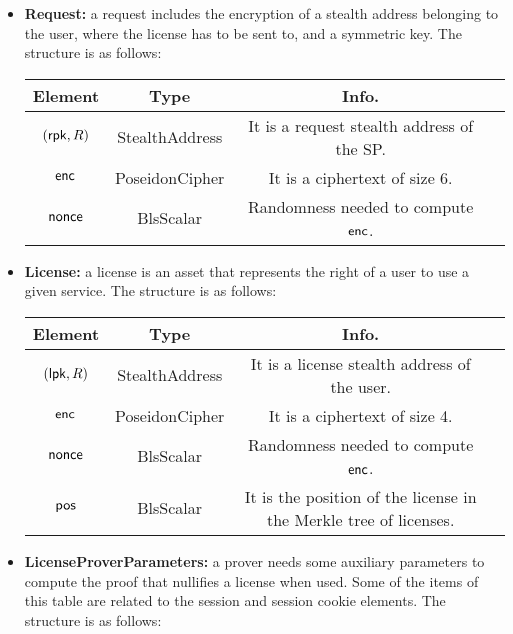 \begin{itemize}
    \item \textbf{Request:} a request includes the encryption of a stealth address belonging to the user, where the license has to be sent to, and a symmetric key. The structure is as follows:

    \begin{center}
        \begin{tabular}{ |c|c|c|c| } 
        \hline
        \textbf{Element} & \textbf{Type} & \textbf{Info.} \\
        \hline
        $(\mathsf{rpk}, R)$ & StealthAddress & It is a request stealth address of the SP. \\
        $\mathsf{enc}$ & PoseidonCipher & It is a ciphertext of size 6. \\
        $\mathsf{nonce}$ & BlsScalar & Randomness needed to compute $\mathsf{enc}$. \\ 
        \hline
        \end{tabular}
    \end{center}


    \item \textbf{License:} a license is an asset that represents the right of a user to use a given service. The structure is as follows:

    \begin{center}
        \begin{tabular}{ |c|c|c|c| } 
        \hline
        \textbf{Element} & \textbf{Type} & \textbf{Info.} \\
        \hline
        $(\mathsf{lpk}, R)$ & StealthAddress & It is a license stealth address of the user. \\
        $\mathsf{enc}$ & PoseidonCipher & It is a ciphertext of size 4. \\
        $\mathsf{nonce}$ & BlsScalar & Randomness needed to compute $\mathsf{enc}$. \\ 
        $\mathsf{pos}$ & BlsScalar & It is the position of the license in the Merkle tree of licenses. \\ 
        \hline
        \end{tabular}
    \end{center}

    \item \textbf{LicenseProverParameters:} a prover needs some auxiliary parameters to compute the proof that nullifies a license when used. Some of the items of this table are related to the session and session cookie elements. The structure is as follows:


\end{itemize}
